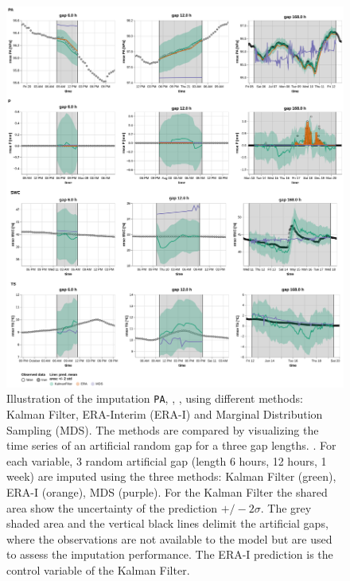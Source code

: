 \documentclass{article}
\newcommand{\imgwidth}{6in}
\begin{document}
\begin{figure}
\centerline{\includegraphics[width=\imgwidth]{images2/timeseries_2}}
\caption{Illustration of the imputation \texttt{PA}, , ,  using different methods: Kalman Filter, ERA-Interim (ERA-I) and Marginal Distribution Sampling (MDS). The methods are compared by visualizing the time series of an artificial random gap for a three gap lengths. . For each variable, 3 random artificial gap (length 6 hours, 12 hours, 1 week) are imputed using the three methods: Kalman Filter (green), ERA-I (orange), MDS (purple).  For the Kalman Filter the shared area show the uncertainty of the prediction $+/- 2 \sigma$. The grey shaded area and the vertical black lines delimit the artificial gaps, where the observations are not available to the model but are used to assess the imputation performance. The ERA-I prediction is the control variable of the Kalman Filter.}
\label{fig:ts_1-2}
\end{figure}


\end{document}
